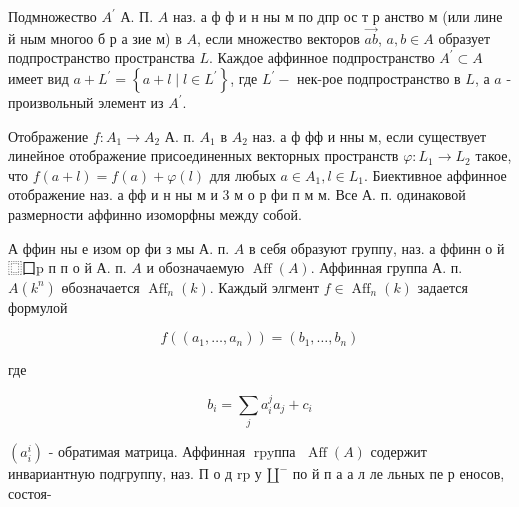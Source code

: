 \documentclass[10pt]{article}
\begin{document}
Подмножество $A^{\prime}$ А. П. $A$ наз. а ф ф и н ны м по дпр ос т р анство м (или лине й ным многоо б р а зие м) в $A$, если множество векторов $\overrightarrow{a b}$, $a, b \in A$ образует подпространство пространства $L$. Каждое аффинное подпространство $A^{\prime} \subset A$ имеет вид $a+L^{\prime}=\left\{a+l \mid l \in L^{\prime}\right\}$, где $L^{\prime}-$ нек-рое подпространство в $L$, а $a$ - произвольный элемент из $A^{\prime}$.



Отображение $f: A_{1} \rightarrow A_{2}$ А. п. $A_{1}$ в $A_{2}$ наз. а ф фф и нны м, если существует линейное отображение присоединенных векторных пространств $\varphi: L_{1} \rightarrow L_{2}$ такое, что $f(a+l)=f(a)+\varphi(l)$ для любых $a \in A_{1}, l \in L_{1}$. Биективное аффинное отображение наз. а фф и н ны м и 3 м о р фи п м м. Все А. п. одинаковой размерности аффинно изоморфны между собой.



А ффин ны е изом ор фи з мы А. п. $A$ в себя образуют группу, наз. а ффинн о й $\mathbf{⿴ 囗} \mathrm{p}$ п п о й А. п. $A$ и обозначаемую $\operatorname{Aff}(A)$. Аффинная группа А. п. $A\left(k^{n}\right)$ өбозначается $\operatorname{Aff}_{n}(k)$. Каждый элгмент $f \in \operatorname{Aff}_{n}(k)$ задается формулой



\[

f\left(\left(a_{1}, \ldots, a_{n}\right)\right)=\left(b_{1}, \ldots, b_{n}\right)

\]



где



\[

b_{i}=\sum_{j} a_{i}^{j} a_{j}+c_{i}

\]



$\left(a_{i}^{i}\right)$ - обратимая матрица. Аффинная $\operatorname{rpyппа~} \operatorname{Aff}(A)$ содержит инвариантную подгруппу, наз. П о д $\mathrm{r} \mathrm{p}$ у $\mathbf{\amalg}^{-}$ по й п а а л ле льных пе р еносов, состоя-
\end{document}
